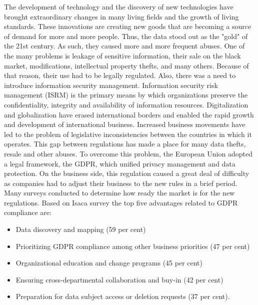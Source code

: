 \documentclass[11pt,english]{article}
\begin{document}
\quad The development of technology and the discovery of new technologies have brought extraordinary changes in many living fields and the growth of living standards. These innovations are creating new goods that are becoming a source of demand for more and more people. Thus, the data stood out as the "gold" of the 21st century. As such, they caused more and more frequent abuses. One of the many problems is leakage of sensitive information, their sale on the black market, modifications, intellectual property thefts, and many others. Because of that reason, their use had to be legally regulated. Also, there was a need to introduce information security management. Information security risk management (ISRM) is the primary means by which organizations preserve the confidentiality, integrity and availability of information resources. \cite{WEBB20141} Digitalization and globalization have erased international borders and enabled the rapid growth and development of international business. Increased business movements have led to the problem of legislative inconsistencies between the countries in which it operates. This gap between regulations has made a place for many data thefts, resale and other abuses. To overcome this problem, the European Union adopted a legal framework, the GDPR, which unified privacy management and data protection. On the business side, this regulation caused a great deal of difficulty as companies had to adjust their business to the new rules in a brief period.
\newline \quad Many surveys conducted to determine how ready the market is for the new regulations. Based on Isaca survey \cite{isaca} the top five advantages related to GDPR compliance are:
\begin{itemize}
  \item Data discovery and mapping (59 per cent)
  \item Prioritizing GDPR compliance among other business priorities (47 per cent)
  \item Organizational education and change programs (45 per cent)
  \item Ensuring cross-departmental collaboration and buy-in (42 per cent)
  \item Preparation for data subject access or deletion requests (37 per cent).
\end{itemize}
\end{document}
